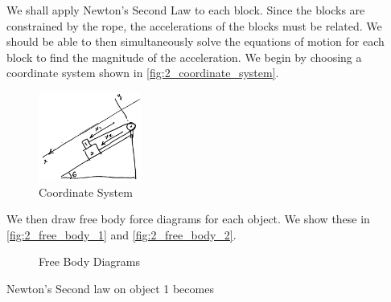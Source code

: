\documentclass{esg8012exam}
\begin{document}
\begin{solution}
  We shall apply Newton's Second Law to each block. Since the blocks are constrained by the rope, the accelerations of the blocks must be related. We should be able to then simultaneously solve the equations of motion for each block to find the magnitude of the acceleration. We begin by choosing a coordinate system shown in \autoref{fig:2_coordinate_system}.
  \begin{figure}[h!]%
    \begin{center}\includegraphics[width=0.3\textwidth]{exam1_s2_1}\end{center}%
    \caption{Coordinate System}
    \label{fig:2_coordinate_system}%
  \end{figure}
  We then draw free body force diagrams for each object. We show these in \autoref{fig:2_free_body_1} and \autoref{fig:2_free_body_2}. \par
  \begin{figure}[h!]
    \begin{center}
    \end{center}
    \caption{Free Body Diagrams}
  \end{figure}
  Newton's Second law on object 1 becomes

\end{solution}
\end{document}
